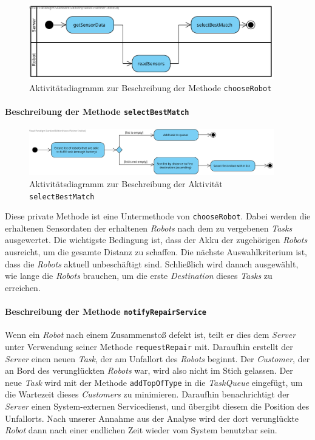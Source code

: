 			\begin{figure}[H]
			\centering
			\includegraphics[width=0.95\textwidth]{img/1-Analyse-3-Choose_Robot}
			\caption{Aktivitätsdiagramm zur Beschreibung der Methode \texttt{chooseRobot}}
			\label{ChooseRobotActivity}
			\end{figure}			
			
			\paragraph{Beschreibung der Methode \texttt{selectBestMatch}}
			\begin{figure}[H]
			\centering
			\includegraphics[width=0.95\textwidth]{img/2-Entwurf-SelectBestMatch}
			\caption{Aktivitätsdiagramm zur Beschreibung der Aktivität \texttt{selectBestMatch}}
			\label{SelectBestMatchActivity}
			\end{figure}
			Diese private Methode ist eine Untermethode von \texttt{chooseRobot}. Dabei werden die erhaltenen Sensordaten der erhaltenen \textit{Robots} nach dem zu vergebenen \textit{Tasks} ausgewertet. Die wichtigste Bedingung ist, dass der Akku der zugehörigen \textit{Robots} ausreicht, um die gesamte Distanz zu schaffen. Die nächste Auswahlkriterium ist, dass die \textit{Robots} aktuell unbeschäftigt sind. Schließlich wird danach ausgewählt, wie lange die \textit{Robots} brauchen, um die erste \textit{Destination} dieses \textit{Tasks} zu erreichen.

			\paragraph{Beschreibung der Methode \texttt{notifyRepairService}}
			Wenn ein \textit{Robot} nach einem Zusammenstoß defekt ist, teilt er dies dem \textit{Server} unter Verwendung seiner Methode \texttt{requestRepair} mit.	Daraufhin erstellt der \textit{Server} einen neuen  \textit{Task}, der am Unfallort des \textit{Robots} beginnt. Der \textit{Customer}, der an Bord des verunglückten \textit{Robots} war, wird also nicht im Stich gelassen. Der neue \textit{Task} wird mit der Methode \texttt{addTopOfType} in die \textit{TaskQueue} eingefügt, um die Wartezeit dieses \textit{Customers} zu minimieren. Daraufhin benachrichtigt der \textit{Server} einen System-externen Servicedienst, und übergibt diesem die Position des Unfallorts. Nach unserer Annahme aus der Analyse wird der dort verunglückte \textit{Robot} dann nach einer endlichen Zeit wieder vom System benutzbar sein.
			

